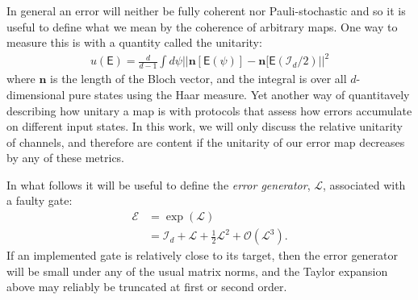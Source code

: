 \documentclass[aps,nofootinbib,pra,notitlepage,twocolumn]{revtex4-1}
\newcommand{\order}[1]{\mathcal{O}\left( #1 \right)}
\newcommand{\errmat}{\ensuremath{{\mathcal{E}}}}
\newcommand{\genmat}{\ensuremath{{\mathcal{L}}}}
\newcommand{\identmat}{\ensuremath{\mathcal{I}}}
\newcommand{\0}{\ensuremath{\mathbf{0}}}
\begin{document}
In general an error will neither be fully coherent nor Pauli-stochastic and so it is useful to define what we mean by the coherence of arbitrary maps\cite{CarignanDugas2019}.
 One way to measure this is with a quantity called the unitarity\cite{Wallman2015}:
\begin{align}
u(\mathsf{E}) = \frac{d}{d-1}\int d\psi ||\mathbf{n}[\mathsf{E}(\psi)] - \mathbf{n}[\mathsf{E}(\identmat_d/2)||^2
\end{align}
where $\mathbf{n}$ is the length of the Bloch vector, and the integral is over all $d$-dimensional pure states using the Haar measure. Yet another way of quantitavely describing how unitary a map is with protocols that assess how errors accumulate on different input states\cite{1907.05950}. In this work, we will only discuss the relative unitarity of channels, and therefore are content if the unitarity of our error map decreases by any of these metrics.

In what follows it will be useful to define the \emph{error generator}, $\genmat$, associated with a faulty gate: 
\begin{align}
	\errmat 
		&= \exp\left(\genmat\right) \\
	\label{eq:generator}
		&= \identmat_d + \genmat + \frac{1}{2}\genmat^2 + \order{\genmat^3}.
\end{align}
If an implemented gate is relatively close to its target, then the error generator will be small under any of the usual matrix norms, and the Taylor expansion above may reliably be truncated at first or second order. 
\end{document}
